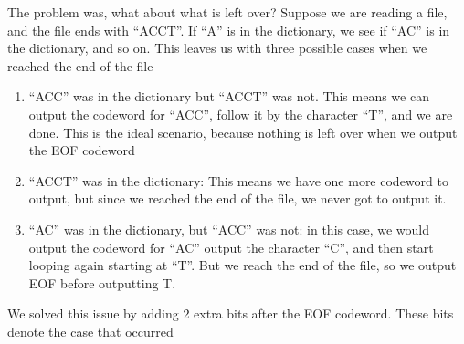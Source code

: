 \documentclass[12pt,twoside]{reedthesis}
\providecommand{\tightlist}{%
  \setlength{\itemsep}{0pt}\setlength{\parskip}{0pt}}
\begin{document}
The problem was, what about what is left over? Suppose we are reading a file, and the file ends with ``ACCT''. If ``A'' is in the dictionary, we see if ``AC'' is in the dictionary, and so on. This leaves us with three possible cases when we reached the end of the file
\begin{enumerate}
\def\labelenumi{\arabic{enumi}.}
\tightlist
\item
  ``ACC'' was in the dictionary but ``ACCT'' was not. This means we can output the codeword for ``ACC'', follow it by the character ``T'', and we are done. This is the ideal scenario, because nothing is left over when we output the EOF codeword
\item
  ``ACCT'' was in the dictionary: This means we have one more codeword to output, but since we reached the end of the file, we never got to output it.
\item
  ``AC'' was in the dictionary, but ``ACC'' was not: in this case, we would output the codeword for ``AC'' output the character ``C'', and then start looping again starting at ``T''. But we reach the end of the file, so we output EOF before outputting T.
\end{enumerate}
We solved this issue by adding 2 extra bits after the EOF codeword. These bits denote the case that occurred
\end{document}

